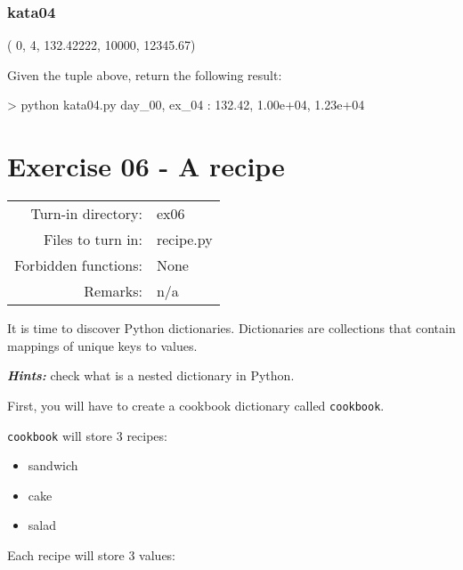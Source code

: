 \documentclass[]{article}
\newenvironment{Shaded}{\begin{snugshade}}{\end{snugshade}}
\newcommand{\NormalTok}[1]{\textcolor[rgb]{0.81,0.81,0.76}{#1}}
\begin{document}
\hypertarget{kata04}{%
\subsubsection{kata04}\label{kata04}}

\begin{Shaded}
\begin{Highlighting}[]
\NormalTok{( 0, 4, 132.42222, 10000, 12345.67)}
\end{Highlighting}
\end{Shaded}

Given the tuple above, return the following result:

\begin{Shaded}
\begin{Highlighting}[]
\NormalTok{> python kata04.py}
\NormalTok{day_00, ex_04 : 132.42, 1.00e+04, 1.23e+04}
\end{Highlighting}
\end{Shaded}

\clearpage

\hypertarget{exercise-06---a-recipe-1}{%
\section{Exercise 06 - A recipe}\label{exercise-06---a-recipe-1}}

\begin{longtable}[]{@{}rl@{}}
\toprule
\endhead
Turn-in directory: & ex06\tabularnewline
Files to turn in: & recipe.py\tabularnewline
Forbidden functions: & None\tabularnewline
Remarks: & n/a\tabularnewline
\bottomrule
\end{longtable}

It is time to discover Python dictionaries. Dictionaries are collections
that contain mappings of unique keys to values.

\textbf{\emph{Hints:}} check what is a nested dictionary in Python.

First, you will have to create a cookbook dictionary called
\texttt{cookbook}.

\texttt{cookbook} will store 3 recipes:

\begin{itemize}
\item
  sandwich
\item
  cake
\item
  salad
\end{itemize}

Each recipe will store 3 values:
\end{document}
